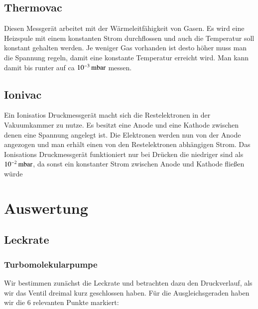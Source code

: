 \subsection*{Thermovac}

Diesen Messgerät arbeitet mit der Wärmeleitfähigkeit von Gasen. Es wird eine Heizspule mit einem konstanten Strom durchflossen und auch die Temperatur soll konstant gehalten werden. Je weniger Gas vorhanden ist desto höher muss man die Spannung regeln, damit eine konstante Temperatur erreicht wird. Man kann damit bis runter auf ca $\unit[10^{-3}]{mbar}$ messen.


\subsection*{Ionivac}

Ein Ionisatios Druckmessgerät macht sich die Restelektronen in der Vakuumkammer zu nutze. Es besitzt eine Anode und eine Kathode zwischen denen eine Spannung angelegt ist. Die Elektronen werden nun von der Anode angezogen und man erhält einen von den Restelektronen abhängigen Strom.
Das Ionisations Druckmessgerät funktioniert nur bei Drücken die niedriger sind als $\unit[10^{-2}]{mbar}$, da sonst ein konstanter Strom zwischen Anode und Kathode fließen würde

\newpage


\section{Auswertung}

\subsection*{Leckrate}

\subsubsection*{Turbomolekularpumpe}

Wir bestimmen zunächst die Leckrate und betrachten dazu den Druckverlauf, als wir das Ventil dreimal kurz geschlossen haben. Für die Ausgleichsgeraden haben wir die 6 relevanten Punkte markiert:

